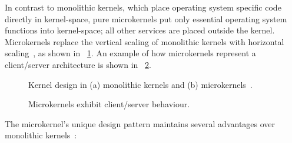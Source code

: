 
In contrast to monolithic kernels, which place operating system specific code
directly in kernel-space, pure microkernels put only essential operating
system functions into
kernel-space; all other services are placed outside the kernel.  Microkernels
replace the vertical scaling of monolithic kernels with horizontal
scaling~\cite{stallings2005}, as shown in \figurename~\ref{fig:kernel_design}.
An example of how microkernels represent a client/server architecture is
shown in \figurename~\ref{fig:microkernel_servers}.

	\begin{figure}[tb]
	\begin{center}
	\end{center}
	\caption{Kernel design in (a) monolithic kernels and (b)
	microkernels~\cite{stallings2005}.}
	\label{fig:kernel_design}
	\end{figure}

	\begin{figure}[tb]
	\begin{center}
	\end{center}
	\caption{Microkernels exhibit client/server behaviour.}
	\label{fig:microkernel_servers}
	\end{figure}

The microkernel's unique design pattern maintains several advantages over
monolithic kernels~\cite{stallings2005}:

